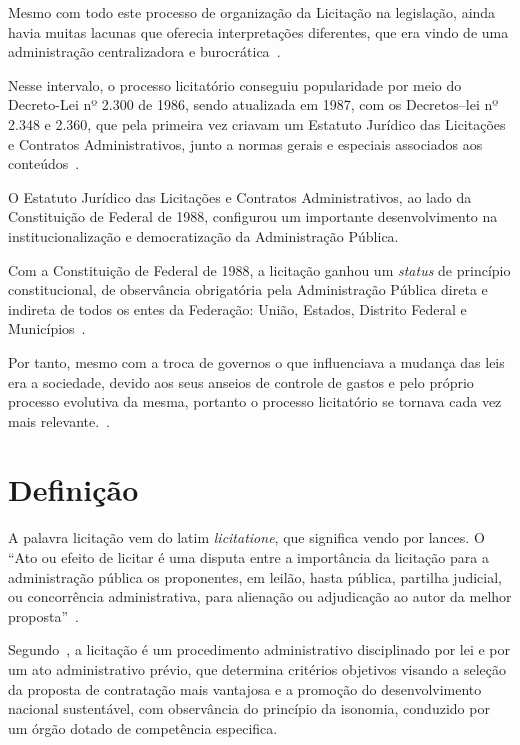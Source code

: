 Mesmo com todo este processo de organização da Licitação na legislação, ainda havia muitas lacunas que oferecia interpretações diferentes, que era vindo de uma administração centralizadora e burocrática~\cite{filho2013}. 

Nesse intervalo, o processo licitatório conseguiu popularidade por meio do Decreto-Lei nº 2.300 de 1986, sendo atualizada em 1987, com os Decretos–lei nº 2.348 e 2.360, que pela primeira vez criavam um Estatuto Jurídico das Licitações e Contratos Administrativos, junto a normas gerais e especiais associados aos conteúdos~\cite{oliveira2013}.

O Estatuto Jurídico das Licitações e Contratos Administrativos, ao lado da Constituição de Federal de 1988, configurou um importante desenvolvimento na institucionalização e democratização da Administração Pública.

Com a Constituição de Federal de 1988, a licitação ganhou um \textit{status} de princípio constitucional, de observância obrigatória pela Administração Pública direta e indireta de todos os entes da Federação: União, Estados, Distrito Federal e Municípios~\cite{de2011pregao}.

Por tanto, mesmo com a troca de governos o que influenciava a mudança das leis era a sociedade, devido aos seus anseios de controle de gastos e pelo próprio processo evolutiva da mesma, portanto o processo licitatório se tornava cada vez mais relevante.~\cite{brazao2013}.

\section{Definição}

A palavra licitação vem do latim \textit{licitatione}, que significa vendo por lances. 
O ``Ato ou efeito de licitar é uma disputa entre a importância da licitação para a administração pública os proponentes, em leilão, hasta pública, partilha judicial, ou concorrência administrativa, para alienação ou adjudicação ao autor da melhor proposta''~\cite{dicionario}.

Segundo~\cite[p. 495]{justen2010curso}, a licitação é um procedimento administrativo disciplinado por lei e por um ato administrativo prévio, que determina critérios objetivos visando a seleção da proposta de contratação mais vantajosa e a promoção do desenvolvimento nacional sustentável, com observância do princípio da isonomia, conduzido por um órgão dotado de competência especifica.

